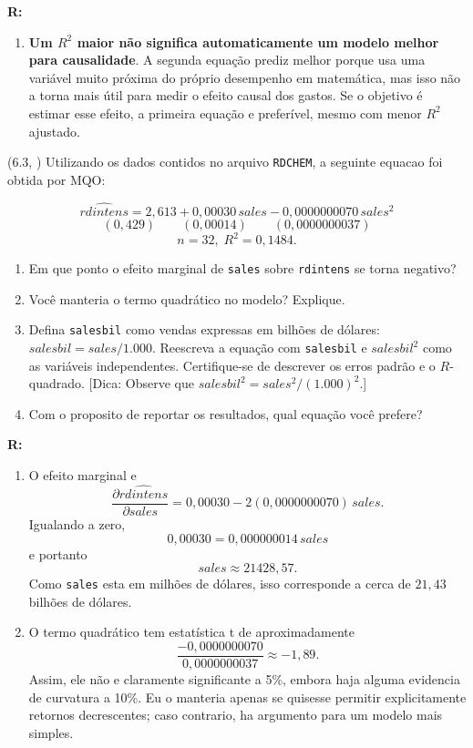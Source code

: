 \documentclass[12pt,letterpaper, onecolumn]{exam}
\renewenvironment{solution}
{\par\noindent\textbf{R:}\enspace\color{blue}}
{\par\color{black}}
\begin{document}
\begin{questions}
\begin{solution}
\begin{enumerate}[label=(\roman*)]
    \item \textbf{Um \(R^2\) maior não significa automaticamente um modelo melhor para causalidade}. A segunda equação prediz melhor porque usa uma variável muito próxima do próprio desempenho em matemática, mas isso não a torna mais útil para medir o efeito causal dos gastos. Se o objetivo é estimar esse efeito, a primeira equação e preferível, mesmo com menor \(R^2\) ajustado.
\end{enumerate}
\end{solution}

\vspace{0.7cm}

\question (6.3, \citep{wooldridge2016}) Utilizando os dados contidos no arquivo \texttt{RDCHEM}, a seguinte equacao foi obtida por MQO:

\[
\widehat{rdintens} = 2{,}613 + 0{,}00030\,sales - 0{,}0000000070\,sales^2
\]
\[
(0{,}429)\qquad (0{,}00014)\qquad (0{,}0000000037)
\]
\[
n = 32,\; R^2 = 0{,}1484.
\]

\begin{enumerate}[label=(\roman*)]
    \item Em que ponto o efeito marginal de \texttt{sales} sobre \texttt{rdintens} se torna negativo?
    \item Você manteria o termo quadrático no modelo? Explique.
    \item Defina \texttt{salesbil} como vendas expressas em bilhões de dólares: \(salesbil = sales/1.000\). Reescreva a equação com \texttt{salesbil} e \(salesbil^2\) como as variáveis independentes. Certifique-se de descrever os erros padrão e o \(R\)-quadrado. [Dica: Observe que \(salesbil^2 = sales^2/(1.000)^2\).]
    \item Com o proposito de reportar os resultados, qual equação você prefere?
\end{enumerate}

\begin{solution}
\begin{enumerate}[label=(\roman*)]
    \item O efeito marginal e
    \[
    \frac{\partial \widehat{rdintens}}{\partial sales}
    =
    0{,}00030 - 2(0{,}0000000070)\,sales.
    \]
    Igualando a zero,
    \[
    0{,}00030 = 0{,}000000014\,sales
    \]
    e portanto
    \[
    sales \approx 21428{,}57.
    \]
    Como \texttt{sales} esta em milhões de dólares, isso corresponde a cerca de \(21{,}43\) bilhões de dólares.

    \item O termo quadrático tem estatística t de aproximadamente
    \[
    \frac{-0{,}0000000070}{0{,}0000000037}\approx -1{,}89.
    \]
    Assim, ele não e claramente significante a 5\%, embora haja alguma evidencia de curvatura a 10\%. Eu o manteria apenas se quisesse permitir explicitamente retornos decrescentes; caso contrario, ha argumento para um modelo mais simples.


\end{enumerate}
\end{solution}
\end{questions}
\end{document}
